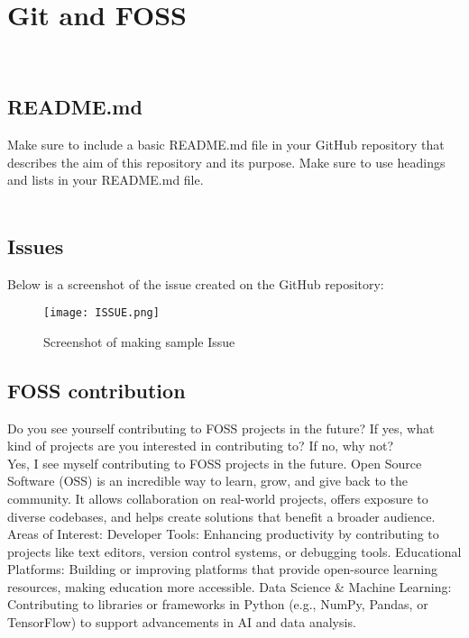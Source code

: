 \documentclass[a4paper,12pt]{article}
\begin{document}
\clearpage

\section{Git and FOSS}
\\
\subsection{README.md}
Make sure to include a basic README.md file in your GitHub repository that describes
the aim of this repository and its purpose.
Make sure to use headings and lists in your README.md file.
\\
\\
\subsection{Issues}
Below is a screenshot of the issue created on the GitHub repository:
\begin{figure}[b!] %
    \centering
    \texttt{[image: ISSUE.png]}
    \caption{Screenshot of making sample Issue}
    \label{fig:enter-label}
\end{figure}


\clearpage

\subsection{FOSS contribution}
Do you see yourself contributing to FOSS projects in the future? If yes, what kind of
projects are you interested in contributing to? If no, why not?
\\
Yes, I see myself contributing to FOSS projects in the future. Open Source Software (OSS) is an incredible way to learn, grow, and give back to the community. It allows collaboration on real-world projects, offers exposure to diverse codebases, and helps create solutions that benefit a broader audience.
Areas of Interest:
Developer Tools: Enhancing productivity by contributing to projects like text editors, version control systems, or debugging tools.
Educational Platforms: Building or improving platforms that provide open-source learning resources, making education more accessible.
Data Science & Machine Learning: Contributing to libraries or frameworks in Python (e.g., NumPy, Pandas, or TensorFlow) to support advancements in AI and data analysis.
\end{document}
